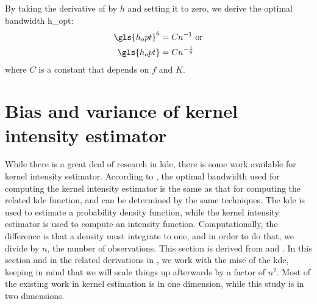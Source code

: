 By taking the derivative of  by $h$ and setting it to zero,
we derive the optimal bandwidth \gls{h_opt}:
\begin{align}
    \gls{h_opt}^{6} & = C n^{-1} \nonumber ~ \text{or} \\
    \gls{h_opt} & = C n^{-\frac{1}{6}}
\end{align}
where $C$ is a constant that depends on $f$ and $K$.



\section{Bias and variance of kernel intensity estimator}
\label{sec:theory:biasvariance}

While there is a great deal of research in \gls{kde},
there is some work available for \gls{kernel intensity estimator}.
According to ,
the optimal bandwidth used for computing the \gls{kernel intensity estimator} is the same as that for computing the related \gls{kde} function,
and can be determined by the same techniques.
The \gls{kde} is used to estimate a probability density function,
while the \gls{kernel intensity estimator} is used to compute an intensity function.
Computationally, the difference is that a density must integrate to one,
and in order to do that,
we divide by $n$,
the number of observations.
This section is derived from  and .
In this section and in the related derivations in ,
we work with the \gls{mise} of the \gls{kde},
keeping in mind that we will scale things up afterwards by a factor of $n^2$.
Most of the existing work in kernel estimation is in one dimension,
while this study is in two dimensions.

